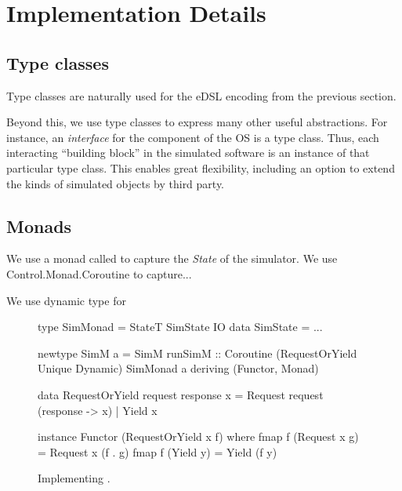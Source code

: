 
\section{Implementation Details}
\label{sec:impl-detail}


\subsection{Type classes}

Type classes are naturally used for the eDSL encoding from the previous section. 

Beyond this, we use type classes to express many other useful abstractions.
For instance, an \emph{interface} for the component of the OS is a type class.
Thus, each interacting ``building block'' in the simulated software is an instance of that particular type class.
This enables great flexibility, including an option to extend the kinds of simulated objects by third party.

\subsection{Monads}
We use a monad called  to capture the \emph{State}
 of the simulator. We use
\textsf{Control.Monad.Coroutine} to capture...

We use dynamic type for 

\begin{figure}
\centering
\begin{code*}
type SimMonad =  StateT SimState IO
data SimState = ...

newtype SimM a
  = SimM { runSimM :: Coroutine
      (RequestOrYield Unique Dynamic)
      SimMonad a }
    deriving (Functor, Monad)

data RequestOrYield request response x
  = Request request (response -> x)
  | Yield   x

instance Functor (RequestOrYield x f) where
  fmap f (Request x g) = Request x (f . g)
  fmap f (Yield y)     = Yield (f y)
\end{code*}
\caption{Implementing .}
\label{fig:code-simm}
\end{figure}

